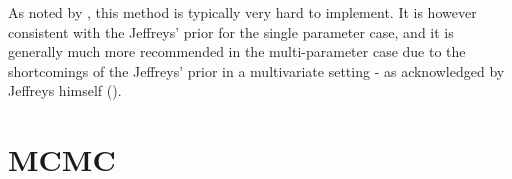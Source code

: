As noted by \cite{berger1992}, this method is typically very hard to implement. It is however consistent with the
Jeffreys' prior for the single parameter case, and it is generally much more recommended in the multi-parameter case due
to the shortcomings of the Jeffreys' prior in a multivariate setting - as acknowledged by Jeffreys himself
(\cite{jeffreys1946}).

\section{MCMC}
\label{sec:MCMC_overview}



